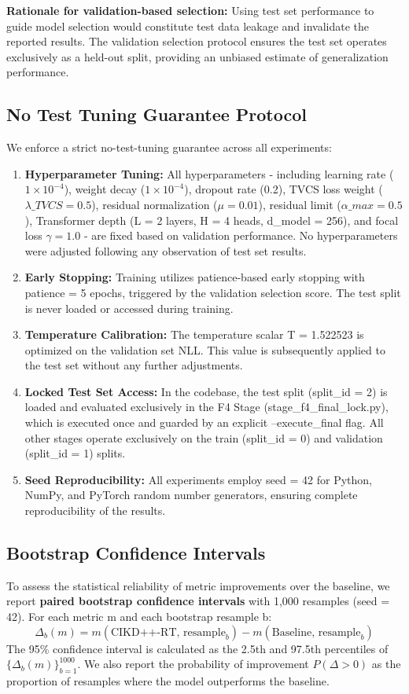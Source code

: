 \textbf{Rationale for validation-based selection:} Using test set performance to guide model selection would constitute test data leakage and invalidate the reported results. The validation selection protocol ensures the test set operates exclusively as a held-out split, providing an unbiased estimate of generalization performance.

\subsection{No Test Tuning Guarantee Protocol}
We enforce a strict no-test-tuning guarantee across all experiments:
\begin{enumerate}
    \item \textbf{Hyperparameter Tuning:} All hyperparameters - including learning rate ($1 \times 10^{-4}$), weight decay ($1 \times 10^{-4}$), dropout rate (0.2), TVCS loss weight ($\lambda\_TVCS = 0.5$), residual normalization ($\mu = 0.01$), residual limit ($\alpha\_max = 0.5$), Transformer depth (L = 2 layers, H = 4 heads, d\_model = 256), and focal loss $\gamma = 1.0$ - are fixed based on validation performance. No hyperparameters were adjusted following any observation of test set results.
    \item \textbf{Early Stopping:} Training utilizes patience-based early stopping with patience = 5 epochs, triggered by the validation selection score. The test split is never loaded or accessed during training.
    \item \textbf{Temperature Calibration:} The temperature scalar T = 1.522523 is optimized on the validation set NLL. This value is subsequently applied to the test set without any further adjustments.
    \item \textbf{Locked Test Set Access:} In the codebase, the test split (split\_id = 2) is loaded and evaluated exclusively in the F4 Stage (stage\_f4\_final\_lock.py), which is executed once and guarded by an explicit --execute\_final flag. All other stages operate exclusively on the train (split\_id = 0) and validation (split\_id = 1) splits.
    \item \textbf{Seed Reproducibility:} All experiments employ seed = 42 for Python, NumPy, and PyTorch random number generators, ensuring complete reproducibility of the results.
\end{enumerate}

\subsection{Bootstrap Confidence Intervals}
To assess the statistical reliability of metric improvements over the baseline, we report \textbf{paired bootstrap confidence intervals} \cite{ref41} with 1,000 resamples (seed = 42). For each metric m and each bootstrap resample b:
\begin{equation}
\Delta_b(m) = m(\text{CIKD++-RT, resample}_b) - m(\text{Baseline, resample}_b)
\end{equation}
The 95\% confidence interval is calculated as the 2.5th and 97.5th percentiles of $\{\Delta_b(m)\}_{b=1}^{1000}$. We also report the probability of improvement $P(\Delta > 0)$ as the proportion of resamples where the model outperforms the baseline.

